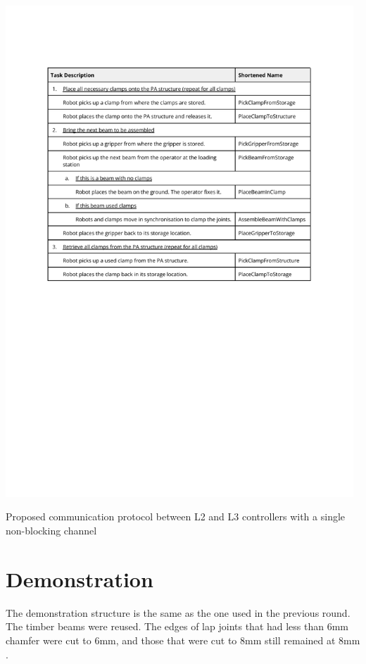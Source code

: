 \begin{table}[!h]
    \includegraphics[page=10, trim=25.4mm 140mm 25.4mm 33mm, clip, width=0.98\textwidth]{tables/Tables in Chapter 6.pdf}
    \caption{Proposed communication protocol between L2 and L3 controllers with a single non-blocking channel}
    \label{table:single-channel-non-blocking-communication-protocol}
\end{table}

\FloatBarrier

\section{Demonstration}
\label{section:exploration-3-demonstration}

The demonstration structure is the same as the one used in the previous round. The timber beams were reused. The edges of lap joints that had less than 6mm chamfer were cut to 6mm, and those that were cut to 8mm still remained at 8mm .

